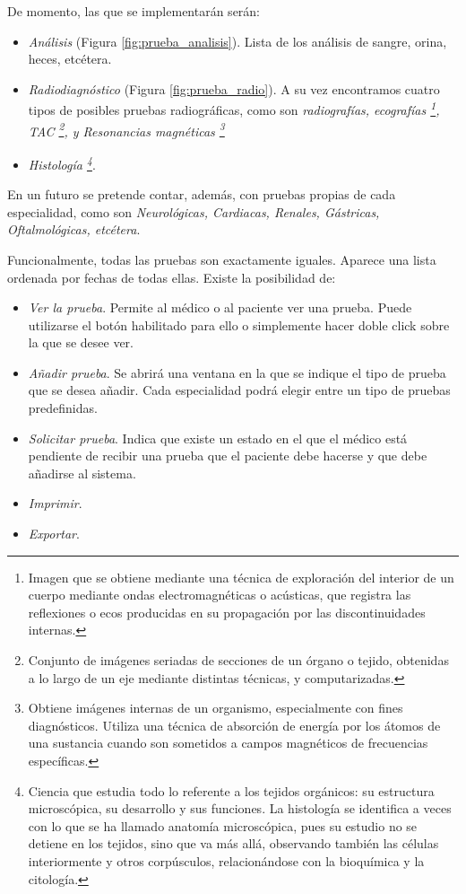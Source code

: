 			De momento, las que se implementarán serán:
	
			\begin{itemize}
				\item \textit{Análisis} (Figura \ref{fig:prueba_analisis}). Lista de los análisis de sangre, orina, heces, etcétera.
				\item \textit{Radiodiagnóstico} (Figura \ref{fig:prueba_radio}). A su vez encontramos cuatro tipos de posibles pruebas radiográficas, como son \textit{radiografías, ecografías \footnote{Imagen que se obtiene mediante una técnica de exploración del interior de un cuerpo mediante ondas electromagnéticas o acústicas, que registra las reflexiones o ecos producidas en su propagación por las discontinuidades internas.}, TAC \footnote{Conjunto de imágenes seriadas de secciones de un órgano o tejido, obtenidas a lo largo de un eje mediante distintas técnicas, y computarizadas.}, y Resonancias magnéticas \footnote{Obtiene imágenes internas de un organismo, especialmente con fines diagnósticos. Utiliza una técnica de absorción de energía por los átomos de una sustancia cuando son sometidos a campos magnéticos de frecuencias específicas.}}
				\item \textit{Histología \footnote{Ciencia que estudia todo lo referente a los tejidos orgánicos: su estructura microscópica, su desarrollo y sus funciones. La histología se identifica a veces con lo que se ha llamado anatomía microscópica, pues su estudio no se detiene en los tejidos, sino que va más allá, observando también las células interiormente y otros corpúsculos, relacionándose con la bioquímica y la citología.}}.
			\end{itemize}
			
			En un futuro se pretende contar, además, con pruebas propias de cada especialidad, como son \textit{Neurológicas, Cardiacas, Renales, Gástricas, Oftalmológicas, etcétera}.
			
			Funcionalmente, todas las pruebas son exactamente iguales. Aparece una lista ordenada por fechas de todas ellas. Existe la posibilidad de:
			
			\begin{itemize}
				\item \textit{Ver la prueba}. Permite al médico o al paciente ver una prueba. Puede utilizarse el botón habilitado para ello o simplemente hacer doble click sobre la que se desee ver.
				\item \textit{Añadir prueba}. Se abrirá una ventana en la que se indique el tipo de prueba que se desea añadir. Cada especialidad podrá elegir entre un tipo de pruebas predefinidas.
				\item \textit{Solicitar prueba}. Indica que existe un estado en el que el médico está pendiente de recibir una prueba que el paciente debe hacerse y que debe añadirse al sistema.
				\item \textit{Imprimir}. 
				\item \textit{Exportar}. 
			\end{itemize}
			
